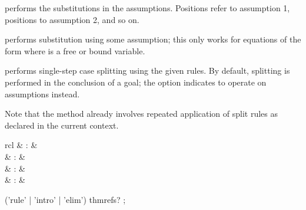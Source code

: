 \begin{isabellebody}
\begin{isamarkuptext}
\begin{descr}
  \item [\mbox{\isa{subst}}~\isa{{\isachardoublequote}{\isacharparenleft}asm{\isacharparenright}\ {\isacharparenleft}i\ {\isasymdots}\ j{\isacharparenright}\ eq{\isachardoublequote}}] performs the
  substitutions in the assumptions.  Positions 
  refer to assumption 1, positions 
  to assumption 2, and so on.

  \item [\mbox{\isa{hypsubst}}] performs substitution using some
  assumption; this only works for equations of the form  where  is a free or bound variable.

  \item [\mbox{\isa{split}}~\isa{{\isachardoublequote}a\isactrlsub {\isadigit{1}}\ {\isasymdots}\ a\isactrlsub n{\isachardoublequote}}] performs
  single-step case splitting using the given rules.  By default,
  splitting is performed in the conclusion of a goal; the  option indicates to operate on assumptions instead.
  
  Note that the \mbox{} method already involves repeated
  application of split rules as declared in the current context.

  \end{descr}%
\end{isamarkuptext}%
\isamarkuptrue%
%
\isamarkuptrue%
%
\isamarkuptrue%
%
\begin{isamarkuptext}%
\begin{matharray}{rcl}
    \mbox{} & : & \isarmeth \\
    \mbox{} & : & \isarmeth \\
    \mbox{} & : & \isarmeth \\
    \mbox{} & : & \isarmeth \\
  \end{matharray}

  \begin{rail}
    ('rule' | 'intro' | 'elim') thmrefs?
    ;
  \end{rail}


\end{isamarkuptext}
\end{isabellebody}
